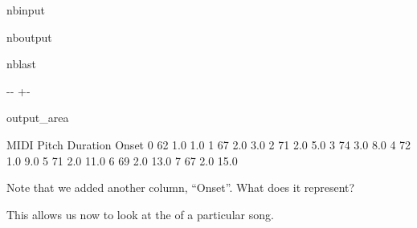 \documentclass[letterpaper,10pt,english]{sphinxmanual}
\newlength\nbsphinxcodecellspacing
\begin{document}
\begin{sphinxuseclass}{nbinput}
{
\begin{sphinxVerbatim}[commandchars=\\\{\}]
\llap{\color{nbsphinxin}[24]:\,\hspace{\fboxrule}\hspace{\fboxsep}}\PYG{p}{[}\PYG{p}{]}
\end{sphinxVerbatim}
}

\end{sphinxuseclass}
\begin{sphinxuseclass}{nboutput}
\begin{sphinxuseclass}{nblast}
{

\kern-\sphinxverbatimsmallskipamount\kern-\baselineskip
\kern+\FrameHeightAdjust\kern-\fboxrule
\vspace{\nbsphinxcodecellspacing}

\begin{sphinxuseclass}{output_area}
\begin{sphinxuseclass}{}


\begin{sphinxVerbatim}[commandchars=\\\{\}]
\llap{\color{nbsphinxout}[24]:\,\hspace{\fboxrule}\hspace{\fboxsep}}   MIDI Pitch  Duration  Onset
0          62       1.0    1.0
1          67       2.0    3.0
2          71       2.0    5.0
3          74       3.0    8.0
4          72       1.0    9.0
5          71       2.0   11.0
6          69       2.0   13.0
7          67       2.0   15.0
\end{sphinxVerbatim}



\end{sphinxuseclass}
\end{sphinxuseclass}
}

\end{sphinxuseclass}
\end{sphinxuseclass}
\sphinxAtStartPar
Note that we added another column, “Onset”. What does it represent?

\sphinxAtStartPar
This allows us now to look at the  of a particular song.
\end{document}
